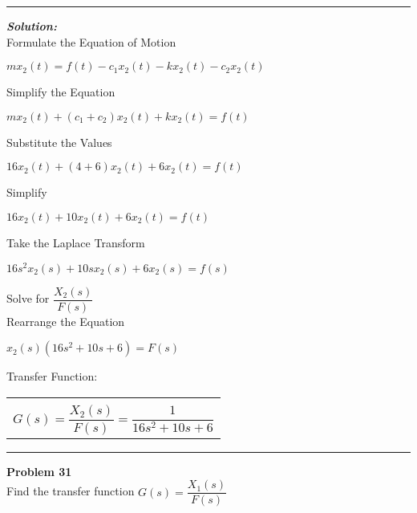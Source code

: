 \documentclass[11pt,letterpaper]{article}
\begin{document}
	\rule{\textwidth}{1pt}
\vspace{12pt}
\textit{\textbf{Solution:}}\\
Formulate the Equation of Motion\\
\begin{center}
	$mx_2(t)=f(t)-c_1x_2(t)-kx_2(t)-c_2x_2(t)$\\
\end{center}
Simplify the Equation\\
\begin{center}
	$mx_2(t)+(c_1+c_2)x_2(t)+kx_2(t)=f(t)$\\
\end{center}
Substitute the Values\\
\begin{center}
	$16x_2(t)+(4+6)x_2(t)+6x_2(t)=f(t)$\\
\end{center}
Simplify\\
\begin{center}
	$16x_2(t)+10x_2(t)+6x_2(t)=f(t)$\\
\end{center}
Take the Laplace Transform\\
\begin{center}
	$16s^2x_2(s)+10sx_2(s)+6x_2(s)=f(s)$\\
\end{center}
Solve for $\dfrac{X_2(s)}{F(s)}$\\[12pt]
Rearrange the Equation\\
\begin{center}
	$x_2(s)(16s^2+10s+6)=F(s)$\\
\end{center}
Transfer Function:\\
\begin{center}
	\begin{tabular}{|c|}
		\hline \\
		$G(s)=\dfrac{X_2(s)}{F(s)}=\dfrac{1}{16s^2+10s+6}$	\\ [12pt]
	\hline
	\end{tabular}	
\end{center}

\clearpage

\rule{\textwidth}{1pt}
\textbf{Problem 31}\\
Find the transfer function $G(s)=\dfrac{X_1(s)}{F(s)}$\\
\end{document}
